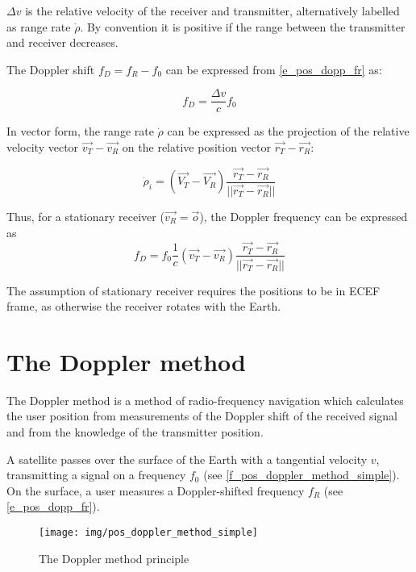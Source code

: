 $\Delta v$ is the relative velocity of the receiver and transmitter, alternatively labelled as range rate $\dot\rho$. By convention it is positive if the range between the transmitter and receiver decreases.

The Doppler shift $f_D = f_R - f_0$ can be expressed from \autoref{e_pos_dopp_fr} as:

\begin{equation}
\label{e_pos_dopp_fd}
f_D = \frac{\Delta v}{c} f_0 
\end{equation}

In vector form, the range rate $\dot\rho$ can be expressed as the projection of the relative velocity vector $\Vec{v_T} - \Vec{v_R}$ on the relative position vector $\Vec{r_T} - \Vec{r_R}$:

\begin{equation}
    \label{e_pos_range_rate}
    \dot\rho_i = (\Vec{V_T} - \Vec{V_R}) \frac{\Vec{r_T} - \Vec{r_R}}{||\Vec{r_T} - \Vec{r_R}||}
\end{equation}

Thus, for a stationary receiver ($\Vec{v_R} = \Vec{o}$), the Doppler frequency can be expressed as
\begin{equation}
    \label{e_pos_dopp_shift}
    f_D = f_0 \frac{1}{c} (\Vec{v_T} - \Vec{v_R}) \frac{\Vec{r_T} - \Vec{r_R}}{||\Vec{r_T} - \Vec{r_R}||}
\end{equation}

The assumption of stationary receiver requires the positions to be in ECEF frame, as otherwise the receiver rotates with the Earth.



\section{The Doppler method}
\label{s_pos_doppler_method}
The Doppler method is a method of radio-frequency navigation which calculates the user position from measurements of the Doppler shift of the received signal and from the knowledge of the transmitter position.

A satellite passes over the surface of the Earth with a tangential velocity $v$, transmitting a signal on a frequency $f_0$ (see \autoref{f_pos_doppler_method_simple}). On the surface, a user measures a Doppler-shifted frequency $f_R$ (see \autoref{e_pos_dopp_fr}).

\begin{figure}
    \centering
    \texttt{[image: img/pos\_doppler\_method\_simple]}
    \caption{The Doppler method principle}
    \label{f_pos_doppler_method_simple}
\end{figure}


